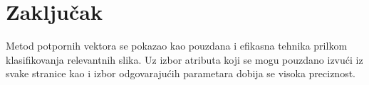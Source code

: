 \documentclass[a4paper]{article}
\begin{document}
\section{Zaključak}
\label{sec:zakljucak}

Metod potpornih vektora se pokazao kao pouzdana i efikasna tehnika prilkom klasifikovanja relevantnih slika. Uz izbor atributa koji se mogu pouzdano izvući iz svake stranice kao i izbor odgovarajućih parametara dobija se visoka preciznost. 

 


\end{document}
